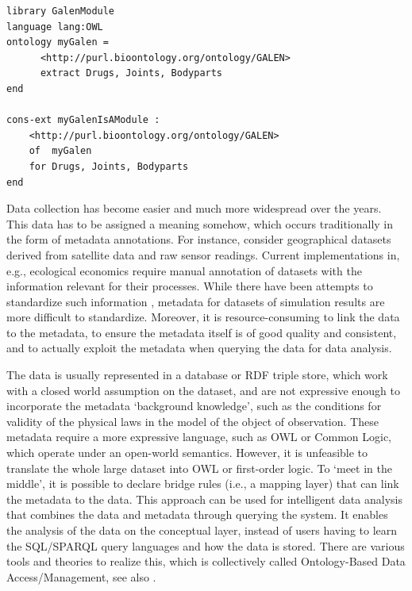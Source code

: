 \documentclass[10pt, a4paper]{isov2}
\newcommand*{\termref}[1]{\index{#1}#1\xspace}
\begin{document}
\begin{lstlisting}[basicstyle=\ttfamily,language=dolText,escapechar=@,mathescape]
%prefix( lang:  <http://purl.net/DOL/languages/> )%
library GalenModule
language lang:OWL
ontology myGalen =
      <http://purl.bioontology.org/ontology/GALEN> 
      extract Drugs, Joints, Bodyparts
end

cons-ext myGalenIsAModule : 
    <http://purl.bioontology.org/ontology/GALEN>
    of  myGalen
    for Drugs, Joints, Bodyparts
end
\end{lstlisting}


Data collection has become easier and much more widespread over the years. This data has to be
assigned a meaning somehow, which occurs traditionally in the  form of metadata annotations. For
instance, consider geographical datasets derived from satellite data and raw sensor readings.
Current implementations in, e.g., ecological economics \cite{bagstad_aries_2011} require manual
annotation of datasets with the information relevant for their processes. While there have been
attempts to standardize such information \cite{european_comission_inspire_2014}, metadata for
datasets of simulation results are more difficult to standardize. Moreover, it is
resource-consuming to link the data to the metadata, to ensure the metadata itself is of good
quality and consistent, and to actually exploit the metadata when querying the data for data
analysis.

The data is usually represented in a database or RDF triple store, which work with a \termref{closed world assumption} on the dataset, and are not expressive enough to
incorporate the metadata `background knowledge', such as the conditions for validity of the physical laws in the model of the object of observation. These metadata
require a more expressive language, such as OWL or Common Logic, which operate under an open-world semantics. However, it is unfeasible to translate the
whole large dataset into OWL or first-order logic. To `meet in the middle', it is possible to declare bridge rules (i.e., a mapping layer) that can link the metadata to
the data. This approach can be used for intelligent data analysis that combines the data and metadata through querying the system. It enables the analysis of the
data on the conceptual layer, instead of users having to learn the SQL/SPARQL query languages and how the data is stored. There are various tools and theories
to realize this, which is collectively called Ontology-Based Data Access/Management, see also \cite{CalvaneseEtAl11}.
\end{document}
